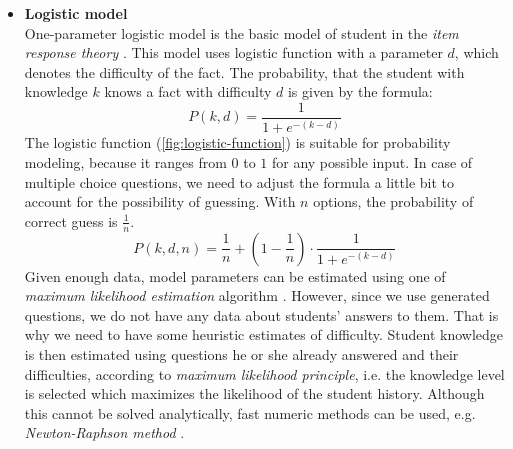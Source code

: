\documentclass[12pt, twoside]{fithesis2}
\renewcommand{\_}{\leavevmode \kern0.07em\vbox{\hrule width0.4em}}
\newcommand{\squarebullet}{\textcolor{black}{\raisebox{0.15em}{\rule{4pt}{4pt}}}}
\newcommand{\emptysquarebullet}{\textcolor{black}{\raisebox{0.10em}{\tiny$\square$}}}
\newenvironment{myItemize}{
  \begin{itemize}[leftmargin=2em,rightmargin=1em,itemsep=\parskip ,parsep=0em,topsep=0em,partopsep=0em]
  \renewcommand{\labelitemi}{\squarebullet}
  \renewcommand{\labelitemii}{\textbullet}
}{
  \end{itemize}
}
\newcounter{choice}
\begin{document}
\begin{myItemize}
\item \textbf{Logistic model}\\
  One-parameter logistic model is the basic model of student in the
  \emph{item response theory} \cite{visual-irt}.
  This model uses logistic function with a parameter $d$, which denotes the difficulty of the fact.
  The probability, that the student with knowledge $k$ knows a fact with difficulty $d$ is given by the formula:
  \begin{equation}\label{eq:logistic}
  P(k, d) = \frac{1}{1 + e^{-(k - d)}}
  \end{equation}
  The logistic function (\autoref{fig:logistic-function}) is suitable for probability modeling, because it ranges from $0$ to $1$ for any possible input.
  In case of multiple choice questions, we need to adjust the formula a little bit to account for the possibility of guessing.
  With $n$ options, the probability of correct guess is $\frac{1}{n}$.
\begin{equation}\label{eq:logistic-mcq}
P(k, d, n) = \frac{1}{n} + \left( 1 - \frac{1}{n} \right) \cdot \frac{1}{1 + e^{-(k - d)}}
\end{equation}
Given enough data, model parameters can be estimated using
one of \emph{maximum likelihood estimation} algorithm \cite{irt-theory-and-practice}.
However, since we use generated questions, we do not have any data about students' answers to them.
That is why we need to have some heuristic estimates of difficulty.
Student knowledge is then estimated using questions he or she already answered and their difficulties,
according to \emph{maximum likelihood principle}, i.e. the knowledge level is selected which maximizes the likelihood of the student history.
Although this cannot be solved analytically, fast numeric methods can be used,
e.g. \emph{Newton-Raphson method} \cite{irt-ability-estimation}.

\begin{figure}[h]
  \centering


\end{figure}
\end{myItemize}
\end{document}
